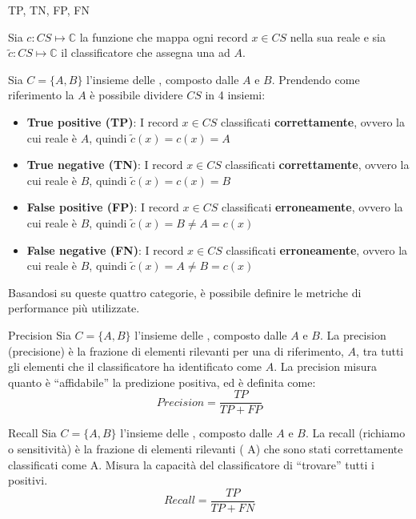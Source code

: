 \begin{definizione}{TP, TN, FP, FN}{}

Sia $c: CS \mapsto \mathbb{C}$ la funzione che mappa ogni record $x \in CS$
nella sua  reale e sia $\tilde{c}: CS \mapsto \mathbb{C}$ il
classificatore che assegna una  ad $A$.

Sia $C = \{A, B\}$ l'insieme delle , composto dalle  $A$ e $B$.
Prendendo come riferimento la  $A$ è possibile dividere $CS$ in 4 insiemi:

\begin{itemize}
    \item \textbf{True positive (TP)}: I record $x \in CS$ classificati \textbf{correttamente},
    ovvero la cui  reale è $A$, quindi $\tilde{c}(x) = c(x) = A$
    \item \textbf{True negative (TN)}: I record $x \in CS$ classificati \textbf{correttamente},
    ovvero la cui  reale è $B$, quindi $\tilde{c}(x) = c(x) = B$
    \item \textbf{False positive (FP)}: I record $x \in CS$ classificati \textbf{erroneamente},
    ovvero la cui  reale è $B$, quindi $\tilde{c}(x) = B \ne A = c(x)$
    \item \textbf{False negative (FN)}: I record $x \in CS$ classificati \textbf{erroneamente},
    ovvero la cui  reale è $B$, quindi $\tilde{c}(x) = A \ne B = c(x)$
\end{itemize}
\end{definizione}

Basandosi su queste quattro categorie, è possibile definire le metriche di
performance più utilizzate.

\begin{definizione}{Precision}{}
Sia $C = \{A, B\}$ l'insieme delle , composto dalle  $A$ e $B$.
La precision (precisione) è la frazione di elementi rilevanti per una 
di riferimento, $A$, tra tutti gli elementi che il classificatore ha
identificato come $A$.
La precision misura quanto è ``affidabile'' la predizione positiva,
ed è definita come:
\[
Precision = \frac{TP}{TP+FP}
\]

\end{definizione}

\begin{definizione}{Recall}{}
Sia $C = \{A, B\}$ l'insieme delle , composto dalle  $A$ e $B$.
La recall (richiamo o sensitività) è la frazione di elementi rilevanti
( A) che sono stati correttamente classificati come A.
Misura la capacità del classificatore di ``trovare'' tutti i positivi.
\[
Recall = \frac{TP}{TP+FN}
\]
\end{definizione}

